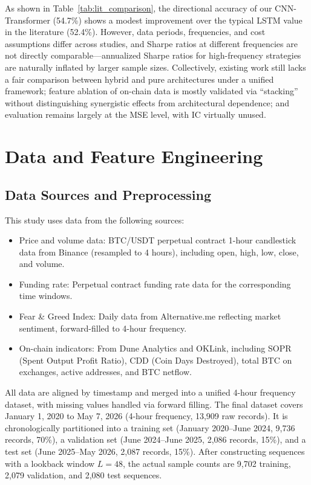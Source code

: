 \documentclass[a4paper]{cas-dc}
\begin{document}
As shown in Table~\ref{tab:lit_comparison}, the directional accuracy of our CNN-Transformer (54.7\%) shows a modest improvement over the typical LSTM value in the literature (52.4\%). However, data periods, frequencies, and cost assumptions differ across studies, and Sharpe ratios at different frequencies are not directly comparable---annualized Sharpe ratios for high-frequency strategies are naturally inflated by larger sample sizes. Collectively, existing work still lacks a fair comparison between hybrid and pure architectures under a unified framework; feature ablation of on-chain data is mostly validated via ``stacking'' without distinguishing synergistic effects from architectural dependence; and evaluation remains largely at the MSE level, with IC virtually unused.

\section{Data and Feature Engineering}

\subsection{Data Sources and Preprocessing}

This study uses data from the following sources:

\begin{itemize}[leftmargin=1.5em]
    \item Price and volume data: BTC/USDT perpetual contract 1-hour candlestick data from Binance (resampled to 4 hours), including open, high, low, close, and volume.
    \item Funding rate: Perpetual contract funding rate data for the corresponding time windows.
    \item Fear \& Greed Index: Daily data from Alternative.me reflecting market sentiment, forward-filled to 4-hour frequency.
    \item On-chain indicators: From Dune Analytics and OKLink, including SOPR (Spent Output Profit Ratio), CDD (Coin Days Destroyed), total BTC on exchanges, active addresses, and BTC netflow.
\end{itemize}

All data are aligned by timestamp and merged into a unified 4-hour frequency dataset, with missing values handled via forward filling. The final dataset covers January 1, 2020 to May 7, 2026 (4-hour frequency, 13,909 raw records). It is chronologically partitioned into a training set (January 2020--June 2024, 9,736 records, 70\%), a validation set (June 2024--June 2025, 2,086 records, 15\%), and a test set (June 2025--May 2026, 2,087 records, 15\%). After constructing sequences with a lookback window $L=48$, the actual sample counts are 9,702 training, 2,079 validation, and 2,080 test sequences.
\end{document}
